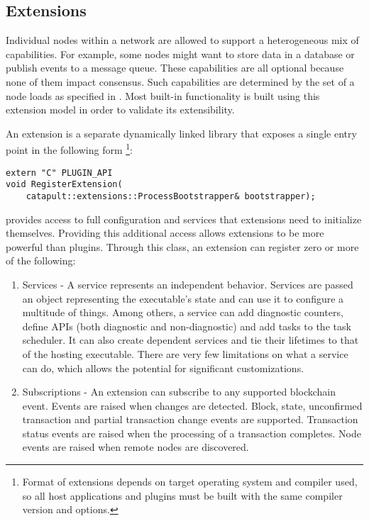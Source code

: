 \subsection{\codenamespace Extensions}
\label{sec:system:extensions}

Individual nodes within a network are allowed to support a heterogeneous mix of capabilities.
For example, some nodes might want to store data in a database or publish events to a message queue.
These capabilities are all optional because none of them impact consensus.
Such capabilities are determined by the set of  a node loads as specified in .
Most built-in \codenamespace functionality is built using this extension model in order to validate its extensibility.

An extension is a separate dynamically linked library that exposes a single entry point in the following form
\footnote{Format of extensions depends on target operating system and compiler used, so all host applications and plugins must be built with the same compiler version and options.}:

\begin{lstlisting}
extern "C" PLUGIN_API
void RegisterExtension(
	catapult::extensions::ProcessBootstrapper& bootstrapper);
\end{lstlisting}

 provides access to full \codenamespace configuration and services that extensions need to initialize themselves.
Providing this additional access allows extensions to be more powerful than plugins.
Through this class, an extension can register zero or more of the following:

\begin{enumerate}
	\item{Services -
		A service represents an independent behavior.
		Services are passed an object representing the executable's state and can use it to configure a multitude of things.
		Among others, a service can add diagnostic counters, define APIs (both diagnostic and non-diagnostic) and add tasks to the task scheduler.
		It can also create dependent services and tie their lifetimes to that of the hosting executable.
		There are very few limitations on what a service can do, which allows the potential for significant customizations.
	}
	\item{Subscriptions -
		An extension can subscribe to any supported blockchain event.
		Events are raised when changes are detected.
		Block, state, unconfirmed transaction and partial transaction change events are supported.
		Transaction status events are raised when the processing of a transaction completes.
		Node events are raised when remote nodes are discovered.
	}
\end{enumerate}


